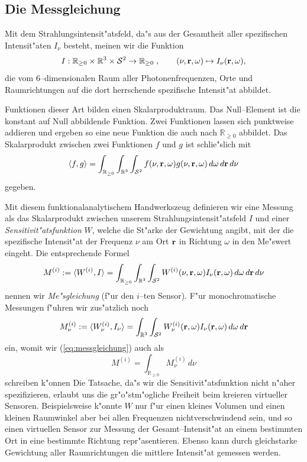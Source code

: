 \documentclass[11pt,a4paper,DIVcalc,BCOR8mm,titlepage,twoside]{scrartcl}
\begin{document}
	
	\subsection{Die Messgleichung}
	Mit dem Strahlungsintensit"atsfeld, da"s aus der Gesamtheit aller spezifischen Intensit"aten $I_\nu$ besteht, meinen wir die Funktion
	$$I:\mathbb{R}_{\geq 0}\times\mathbb{R}^3\times\mathcal{S}^2\to\mathbb{R}_{\geq 0}\;,\qquad (\nu,\mathbf{r},\omega)\mapsto I_\nu(\mathbf{r},\omega),$$
	die vom 6--dimensionalen Raum aller Photonenfrequenzen, Orte und Raumrichtungen auf die dort herrschende spezifische Intensit"at abbildet.
	
	Funktionen dieser Art bilden einen Skalarproduktraum. Das Null--Element ist die konstant auf Null abbildende Funktion. Zwei Funktionen lassen sich punktweise addieren und ergeben so eine neue Funktion die auch nach $\mathbb{R}_{\geq 0}$ abbildet. Das Skalarprodukt zwischen zwei Funktionen $f$ und $g$ ist schlie"slich mit
	$$\langle f,g\rangle=\int_{\mathbb{R}_{\geq 0}} \int_{\mathbb{R}^3} \int_{\mathcal{S}^2} f(\nu,\mathbf{r},\omega)g(\nu,\mathbf{r},\omega)\,d\omega\,d\mathbf{r}\,d\nu$$
	gegeben.
	
	Mit diesem funktionalanalytischem Handwerkszeug definieren wir eine Messung als das Skalarprodukt zwischen unserem Strahlungsintensit"atsfeld $I$ und einer {\em Sensitivit"atsfunktion} $W$, welche die St"arke der Gewichtung angibt, mit der die spezifische Intensit"at der Frequenz $\nu$ am Ort $\mathbf{r}$ in Richtung $\omega$ in den Me"swert eingeht. Die entsprechende Formel
	\begin{equation}\label{eq:messgleichung}
		M^{(i)}:=\langle W^{(i)},I\rangle=\int_{\mathbb{R}_{\geq 0}} \int_{\mathbb{R}^3} \int_{\mathcal{S}^2} W^{(i)}(\nu,\mathbf{r},\omega)I_\nu(\mathbf{r},\omega)\,d\omega\,d\mathbf{r}\,d\nu
	\end{equation}
	nennen wir {\em Me"sgleichung} (f"ur den $i$--ten Sensor). F"ur monochromatische Messungen f"uhren wir zus"atzlich noch 
	\begin{equation}\label{eq:messgleichung_mono}
		M_\nu^{(i)}:=\langle W_\nu^{(i)},I_\nu\rangle=\int_{\mathbb{R}^3} \int_{\mathcal{S}^2} W_\nu^{(i)}(\mathbf{r},\omega)I_\nu(\mathbf{r},\omega)\,d\omega\,d\mathbf{r}
	\end{equation}
	ein, womit wir (\ref{eq:messgleichung}) auch als
	\begin{equation}\label{eq:messgleichung_frommonos}
		M^{(i)}=\int_{\mathbb{R}_{\geq 0}} M_\nu^{(i)}\,d\nu
	\end{equation}
	schreiben k"onnen
	Die Tatsache, da"s wir die Sensitivit"atsfunktion nicht n"aher spezifizieren, erlaubt uns die gr"o"stm"ogliche Freiheit beim kreieren virtueller Sensoren. Beispielsweise k"onnte $W$ nur f"ur einen kleines Volumen und einen kleinen Raumwinkel aber bei allen Frequenzen nichtverschwindend sein, und so einen virtuellen Sensor zur Messung der Gesamt--Intensit"at an einem bestimmten Ort in eine bestimmte Richtung repr"asentieren. Ebenso kann durch gleichstarke Gewichtung aller Raumrichtungen die mittlere Intensit"at gemessen werden.
	
\end{document}
